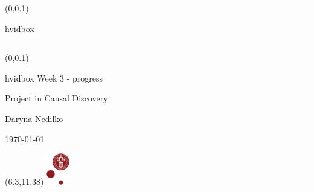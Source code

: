 \documentclass[t,24pt,aspectratio=169]{beamer}
\begin{document}
{
\begin{frame}
    \begin{textblock*}{\textwidth}(0\textwidth,0.1\textheight)
        \begin{beamercolorbox}[wd=7.8cm,ht=7.3cm,sep=0.5cm]{hvidbox}
            \fontsize{5}{10}\selectfont {}
            \noindent\textcolor{KUrod}{\rule{6.8cm}{0.4pt}}
        \end{beamercolorbox}
    \end{textblock*}
    \begin{textblock*}{\textwidth}(0\textwidth,0.1\textheight)
        \begin{beamercolorbox}[wd=7.8cm,sep=0.5cm]{hvidbox}
                \Huge \textcolor{KUrod}{Week 3 - progress}
                \vspace{0.5cm}
                \par
                \Large Project in Causal Discovery
                \vspace{0.5cm}
                \par
                \normalsize Daryna Nedilko
                
                \today
        \end{beamercolorbox}
    \end{textblock*}
    \begin{textblock}{1}(6.3,11.38)
        \includegraphics[width=1cm]{KU/KU-logo.png}
    \end{textblock}
\end{frame}
}
\end{document}
